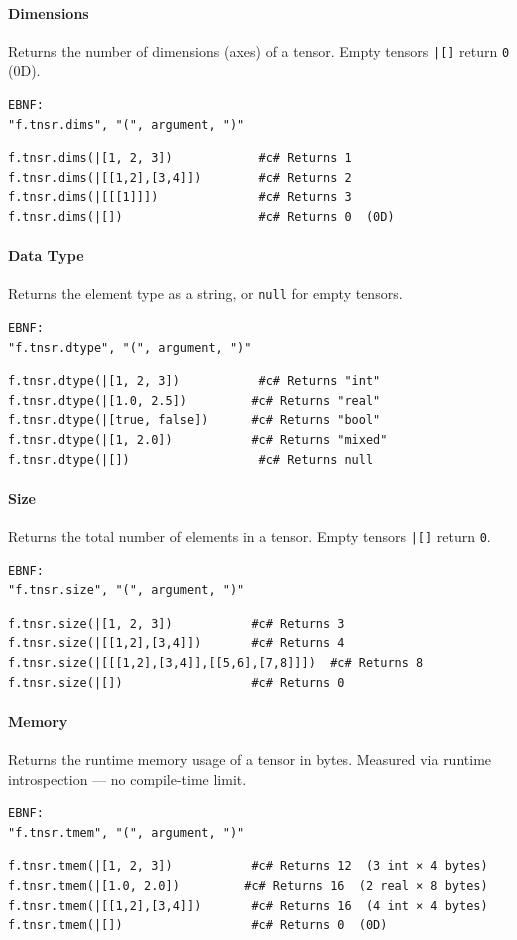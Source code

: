 \paragraph{Dimensions}
Returns the number of dimensions (axes) of a tensor. Empty tensors \texttt{|[]} return \texttt{0} (0D).
\begin{verbatim}
EBNF:
"f.tnsr.dims", "(", argument, ")"
\end{verbatim}
\begin{verbatim}
f.tnsr.dims(|[1, 2, 3])            #c# Returns 1
f.tnsr.dims(|[[1,2],[3,4]])        #c# Returns 2
f.tnsr.dims(|[[[1]]])              #c# Returns 3
f.tnsr.dims(|[])                   #c# Returns 0  (0D)
\end{verbatim}

\paragraph{Data Type}
Returns the element type as a string, or \texttt{null} for empty tensors.
\begin{verbatim}
EBNF:
"f.tnsr.dtype", "(", argument, ")"
\end{verbatim}
\begin{verbatim}
f.tnsr.dtype(|[1, 2, 3])           #c# Returns "int"
f.tnsr.dtype(|[1.0, 2.5])         #c# Returns "real"
f.tnsr.dtype(|[true, false])      #c# Returns "bool"
f.tnsr.dtype(|[1, 2.0])           #c# Returns "mixed"
f.tnsr.dtype(|[])                  #c# Returns null
\end{verbatim}

\paragraph{Size}
Returns the total number of elements in a tensor. Empty tensors \texttt{|[]} return \texttt{0}.
\begin{verbatim}
EBNF:
"f.tnsr.size", "(", argument, ")"
\end{verbatim}
\begin{verbatim}
f.tnsr.size(|[1, 2, 3])           #c# Returns 3
f.tnsr.size(|[[1,2],[3,4]])       #c# Returns 4
f.tnsr.size(|[[[1,2],[3,4]],[[5,6],[7,8]]])  #c# Returns 8
f.tnsr.size(|[])                  #c# Returns 0
\end{verbatim}

\paragraph{Memory}
Returns the runtime memory usage of a tensor in bytes. Measured via runtime introspection — no compile-time limit.
\begin{verbatim}
EBNF:
"f.tnsr.tmem", "(", argument, ")"
\end{verbatim}
\begin{verbatim}
f.tnsr.tmem(|[1, 2, 3])           #c# Returns 12  (3 int × 4 bytes)
f.tnsr.tmem(|[1.0, 2.0])         #c# Returns 16  (2 real × 8 bytes)
f.tnsr.tmem(|[[1,2],[3,4]])       #c# Returns 16  (4 int × 4 bytes)
f.tnsr.tmem(|[])                  #c# Returns 0  (0D)
\end{verbatim}

